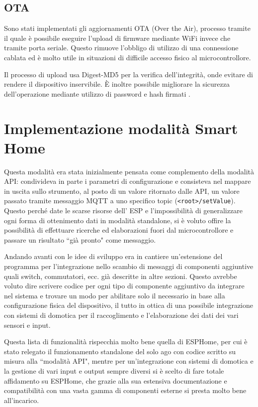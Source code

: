 \documentclass[12pt,a4paper]{report}
\begin{document}
\subsection{OTA}
Sono stati implementati gli aggiornamenti OTA (Over the Air), processo tramite il quale è possibile eseguire l'upload di firmware
mediante WiFi invece che tramite porta seriale. Questo rimuove l'obbligo di utilizzo di una connessione cablata ed è molto utile
in situazioni di difficile accesso fisico al microcontrollore.

Il processo di upload usa Digest-MD5 per la verifica dell'integrità, onde evitare di rendere il dispositivo inservibile. È inoltre possibile
migliorare la sicurezza dell'operazione mediante utilizzo di password e hash firmati  \cite{espota}.

\section{Implementazione modalità Smart Home}
Questa modalità era stata inizialmente pensata come complemento della modalità API: condivideva in parte i parametri di configurazione
e consisteva nel mappare in uscita sullo strumento, al posto di un valore ritornato dalle API, un valore passato tramite messaggio MQTT
a uno specifico topic (\texttt{<root>/setValue}).
Questo perché date le scarse risorse dell' ESP e l'impossibilità di generalizzare ogni forma di ottenimento dati in modalità standalone,
si è voluto offire la possibilità di effettuare ricerche ed elaborazioni fuori dal microcontrollore e passare un risultato ``già pronto"
come messaggio.

Andando avanti con le idee di sviluppo era in cantiere un'estensione del programma per l'integrazione nello scambio di messaggi di
componenti aggiuntive quali switch, commutatori, ecc. già descritte in altre sezioni.
Questo avrebbe voluto dire scrivere codice per ogni tipo di componente aggiuntivo da integrare nel sistema e trovare un modo per
abilitare solo il necessario in base alla configurazione fisica del dispositivo,
il tutto in ottica di una possibile integrazione con sistemi di domotica per il raccoglimento e l'elaborazione dei dati dei vari sensori e input.

Questa lista di funzionalità rispecchia molto bene quella di ESPHome, per cui è stato relegato il funzionamento standalone del solo ago
con codice scritto su misura alla ``modalità API", mentre per un'integrazione con sistemi di domotica e la gestione di vari input e output
sempre diversi si è scelto di fare totale affidamento su ESPHome, che grazie alla sua estensiva documentazione e compatibilità con una
vasta gamma di componenti esterne si presta molto bene all'incarico.
\end{document}
